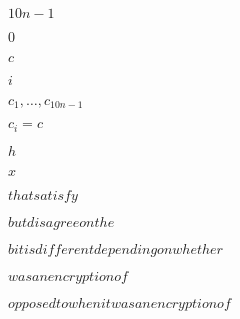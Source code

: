 \documentclass[10pt]{book}
\begin{document}
\begin{mdSnippets}
\begin{mdInlineSnippet}[be593c94742241de0998dbd0597a2b7f]%
$10n-1$\end{mdInlineSnippet}%
\begin{mdInlineSnippet}%
$0$\end{mdInlineSnippet}%
\begin{mdInlineSnippet}[4a8a08f09d37b73795649038408b5f33]%
$c$\end{mdInlineSnippet}%
\begin{mdInlineSnippet}[865c0c0b4ab0e063e5caa3387c1a8741]%
$i$\end{mdInlineSnippet}%
\begin{mdInlineSnippet}[f7286d5bf7cb9aa5117c87d10dbe730c]%
$c_1,\ldots,c_{10n-1}$\end{mdInlineSnippet}%
\begin{mdInlineSnippet}[707905635465f0336f7dc373b35d6713]%
$c_i=c$\end{mdInlineSnippet}%
\begin{mdInlineSnippet}[2510c39011c5be704182423e3a695e91]%
$h$\end{mdInlineSnippet}%
\begin{mdInlineSnippet}[9dd4e461268c8034f5c8564e155c67a6]%
$x$\end{mdInlineSnippet}%
\begin{mdInlineSnippet}[7a6032b4d9bc67f2e848746e8f53d2fc]%
$ that satisfy $\end{mdInlineSnippet}%
\begin{mdInlineSnippet}[afdbe8b16ac3e175cf50d527032dd8ae]%
$ but disagree on the $\end{mdInlineSnippet}%
\begin{mdInlineSnippet}[698e73bb40a7b029f34625856309e297]%
$ bit is different depending on whether  $\end{mdInlineSnippet}%
\begin{mdInlineSnippet}%
$ was an encryption of $\end{mdInlineSnippet}%
\begin{mdInlineSnippet}[77be21661088d2e72f1b55c273ec4760]%
$ opposed to when it was an encryption of $\end{mdInlineSnippet}%

\end{mdSnippets}
\end{document}
